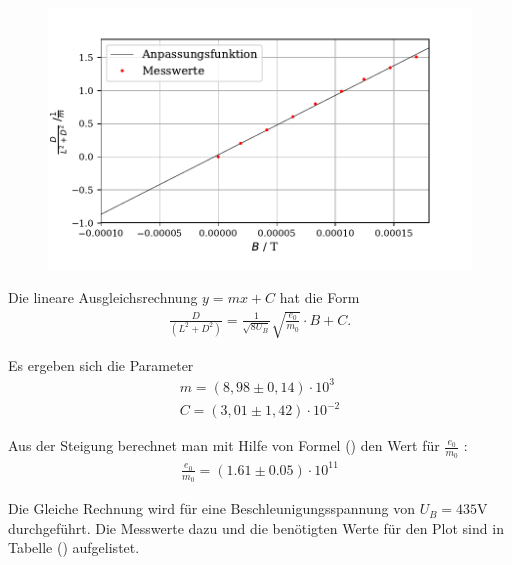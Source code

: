 \begin{figure}[H]
  \centering
  \includegraphics{plot1.pdf}
  \caption{}
  \label{fig:plot}
\end{figure}

Die lineare Ausgleichsrechnung $y = mx+C$ hat die Form
\begin{align*}
    \frac{D}{(L^2+D^2)} = \frac{1}{\sqrt{8U_B}}\sqrt{\frac{e_0}{m_0}} \cdot B + C .
\end{align*}

Es ergeben sich die Parameter
\begin{align*}
    m = (8,98 \pm 0,14) \cdot 10^{3} \\
    C = (3,01 \pm 1,42) \cdot 10^{-2}
\end{align*}

Aus der Steigung berechnet man mit Hilfe von Formel () den Wert für $\frac{e_0}{m_0}$ :
\begin{align*}
\frac{e_0}{m_0} = (1.61 \pm 0.05) \cdot 10^{11}
\end{align*}

Die Gleiche Rechnung wird für eine Beschleunigungsspannung von $U_B = 435\si{\volt}$ durchgeführt. Die Messwerte dazu und die benötigten Werte für den Plot sind in Tabelle () aufgelistet.

